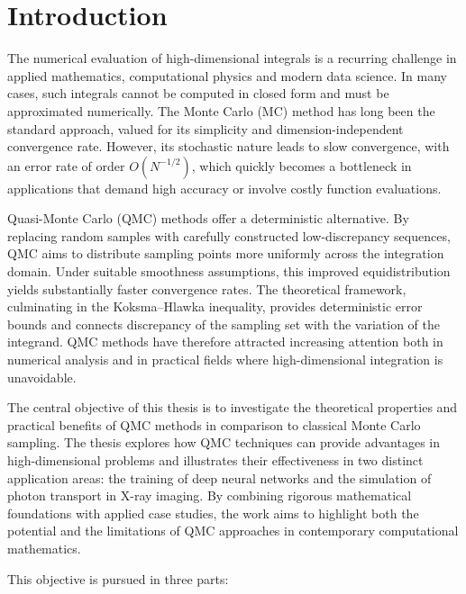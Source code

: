 
\mainmatter
\chapter{Introduction}
\label{introduction}


The numerical evaluation of high-dimensional integrals is a recurring challenge in applied mathematics, computational physics and modern data science. In many cases, such integrals cannot be computed in closed form and must be approximated numerically. The Monte Carlo (MC) method has long been the standard approach, valued for its simplicity and dimension-independent convergence rate. However, its stochastic nature leads to slow convergence, with an error rate of order $O(N^{-1/2})$, which quickly becomes a bottleneck in applications that demand high accuracy or involve costly function evaluations.  

Quasi-Monte Carlo (QMC) methods offer a deterministic alternative. By replacing random samples with carefully constructed low-discrepancy sequences, QMC aims to distribute sampling points more uniformly across the integration domain. Under suitable smoothness assumptions, this improved equidistribution yields substantially faster convergence rates. The theoretical framework, culminating in the Koksma--Hlawka inequality, provides deterministic error bounds and connects discrepancy of the sampling set with the variation of the integrand. QMC methods have therefore attracted increasing attention both in numerical analysis and in practical fields where high-dimensional integration is unavoidable.

The central objective of this thesis is to investigate the theoretical properties and practical benefits of QMC methods in comparison to classical Monte Carlo sampling. The thesis explores how QMC techniques can provide advantages in high-dimensional problems and illustrates their effectiveness in two distinct application areas: the training of deep neural networks and the simulation of photon transport in X-ray imaging. By combining rigorous mathematical foundations with applied case studies, the work aims to highlight both the potential and the limitations of QMC approaches in contemporary computational mathematics.

This objective is pursued in three parts:

